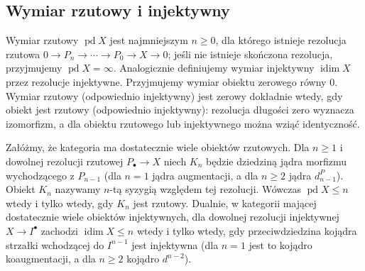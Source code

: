 \subsection{Wymiar rzutowy i injektywny}
\begin{definicja}\label{cat:def:homological-dimensions}
Wymiar rzutowy $\operatorname{pd}X$ jest najmniejszym $n\ge0$, dla którego istnieje rezolucja rzutowa $0\to P_n\to\cdots\to P_0\to X\to0$; jeśli nie istnieje skończona rezolucja, przyjmujemy $\operatorname{pd}X=\infty$. Analogicznie definiujemy wymiar injektywny $\operatorname{idim}X$ przez rezolucje injektywne. Przyjmujemy wymiar obiektu zerowego równy $0$. Wymiar rzutowy (odpowiednio injektywny) jest zerowy dokładnie wtedy, gdy obiekt jest rzutowy (odpowiednio injektywny): rezolucja długości zero wyznacza izomorfizm, a dla obiektu rzutowego lub injektywnego można wziąć identyczność.
\end{definicja}
\begin{stwierdzenie}\label{cat:prop:syzygy-dimension}
Załóżmy, że kategoria ma dostatecznie wiele obiektów rzutowych. Dla $n\ge1$ i dowolnej rezolucji rzutowej $P_\bullet\to X$ niech $K_n$ będzie dziedziną jądra morfizmu wychodzącego z $P_{n-1}$ (dla $n=1$ jądra augmentacji, a dla $n\ge2$ jądra $d_{n-1}^P$). Obiekt $K_n$ nazywamy $n$-tą syzygią względem tej rezolucji. Wówczas $\operatorname{pd}X\le n$ wtedy i tylko wtedy, gdy $K_n$ jest rzutowy. Dualnie, w kategorii mającej dostatecznie wiele obiektów injektywnych, dla dowolnej rezolucji injektywnej $X\to I^\bullet$ zachodzi $\operatorname{idim}X\le n$ wtedy i tylko wtedy, gdy przeciwdziedzina kojądra strzałki wchodzącej do $I^{n-1}$ jest injektywna (dla $n=1$ jest to kojądro koaugmentacji, a dla $n\ge2$ kojądro $d^{n-2}$).
\end{stwierdzenie}
